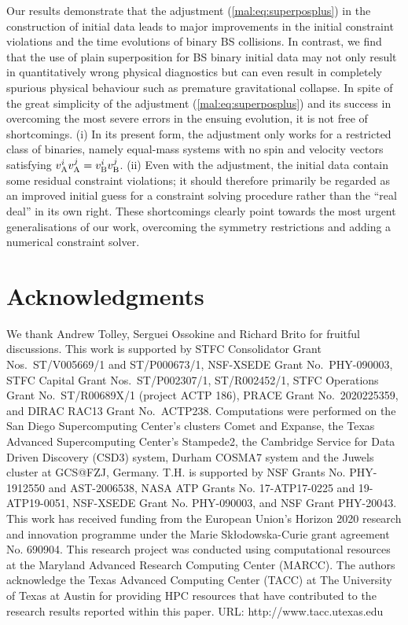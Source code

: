 Our results demonstrate that
the adjustment (\ref{mal:eq:superposplus}) in the construction of initial
data leads to major improvements in the initial constraint violations and the
time evolutions of binary BS collisions. In contrast, we find that the use of plain
superposition for BS binary initial data may not only result in quantitatively
wrong physical diagnostics but can even result in completely spurious physical behaviour
such as premature gravitational collapse. In spite of the great simplicity of the
adjustment (\ref{mal:eq:superposplus}) and its success in overcoming the most
severe errors in the ensuing evolution, it is not free of shortcomings.
(i) In its present form, the adjustment only works for a restricted class of
binaries, namely equal-mass systems with no spin and velocity vectors
satisfying $v_{\rm A}^i v_{\rm A}^j=v_{\rm B}^i v_{\rm B}^j$. (ii) Even with
the adjustment, the initial data contain some residual constraint violations;
it should therefore primarily be regarded as an improved initial guess for
a constraint solving procedure rather than the ``real deal'' in its own right.
These shortcomings clearly point towards the most urgent generalisations of our
work, overcoming the symmetry restrictions and adding a numerical constraint
solver.


\section*{Acknowledgments}
We thank Andrew Tolley, Serguei Ossokine and Richard Brito for fruitful discussions.
This work is supported by
STFC Consolidator Grant Nos.~ST/V005669/1 and ST/P000673/1,
NSF-XSEDE Grant No.~PHY-090003,
STFC Capital Grant Nos.~ST/P002307/1, ST/R002452/1,
STFC Operations Grant No.~ST/R00689X/1 (project ACTP 186),
PRACE Grant No.~2020225359,
and
DIRAC RAC13 Grant No.~ACTP238.
Computations were performed on
the San Diego Supercomputing Center's clusters Comet and Expanse,
the Texas Advanced Supercomputing Center's Stampede2,
the Cambridge Service for Data Driven Discovery (CSD3) system, Durham COSMA7 system
and
the Juwels cluster at GCS@FZJ, Germany.
T.H. is supported by NSF Grants No. PHY-1912550 and AST-2006538, NASA ATP Grants No. 17-ATP17-0225 and 19-ATP19-0051, NSF-XSEDE Grant No. PHY-090003, and NSF Grant PHY-20043. This work has received funding from the European Union’s Horizon 2020 research and innovation programme under the Marie Skłodowska-Curie grant agreement No. 690904. This research project was conducted using computational resources at the Maryland Advanced Research Computing Center (MARCC).
The authors acknowledge the Texas Advanced Computing Center (TACC) at The University of Texas at Austin for providing HPC resources that have contributed to the research results reported within this paper. URL: http://www.tacc.utexas.edu \cite{10.1145/3311790.3396656}

